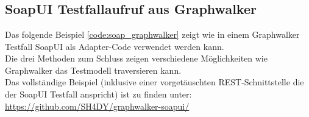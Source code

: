 \chapter{\appendixlabel}



\section{SoapUI Testfallaufruf aus Graphwalker}
\label{app:soap}
Das folgende Beispiel \ref{code:soap_graphwalker} zeigt wie in einem Graphwalker Testfall SoapUI als Adapter-Code verwendet werden kann.\\
Die drei Methoden zum Schluss zeigen verschiedene Möglichkeiten wie Graphwalker das Testmodell traversieren kann.\\
Das vollständige Beispiel (inklusive einer vorgetäuschten REST-Schnittstelle die der SoapUI Testfall anspricht) ist zu finden unter: \url{https://github.com/SH4DY/graphwalker-soapui/}


